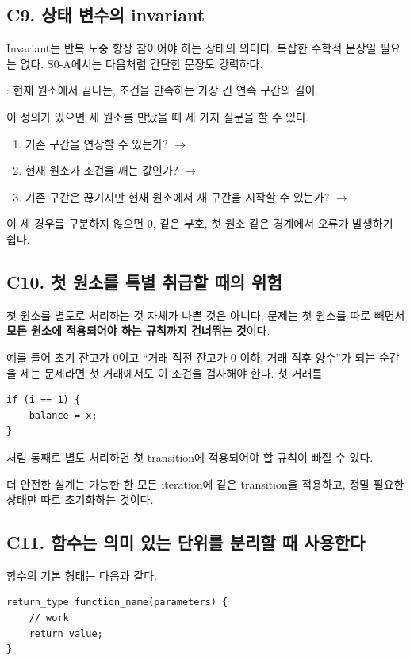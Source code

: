 \subsection{C9. 상태 변수의 invariant}
Invariant는 반복 도중 항상 참이어야 하는 상태의 의미다. 복잡한 수학적 문장일 필요는 없다. S0-A에서는 다음처럼 간단한 문장도 강력하다.

\begin{conceptbox}[예시 invariant]
: 현재 원소에서 끝나는, 조건을 만족하는 가장 긴 연속 구간의 길이.
\end{conceptbox}

이 정의가 있으면 새 원소를 만났을 때 세 가지 질문을 할 수 있다.
\begin{enumerate}
  \item 기존 구간을 연장할 수 있는가? $\rightarrow$ 
  \item 현재 원소가 조건을 깨는 값인가? $\rightarrow$ 
  \item 기존 구간은 끊기지만 현재 원소에서 새 구간을 시작할 수 있는가? $\rightarrow$ 
\end{enumerate}

이 세 경우를 구분하지 않으면 0, 같은 부호, 첫 원소 같은 경계에서 오류가 발생하기 쉽다.

\subsection{C10. 첫 원소를 특별 취급할 때의 위험}
첫 원소를 별도로 처리하는 것 자체가 나쁜 것은 아니다. 문제는 첫 원소를 따로 빼면서 \textbf{모든 원소에 적용되어야 하는 규칙까지 건너뛰는 것}이다.

예를 들어 초기 잔고가 0이고 ``거래 직전 잔고가 0 이하, 거래 직후 양수''가 되는 순간을 세는 문제라면 첫 거래에서도 이 조건을 검사해야 한다. 첫 거래를
\begin{lstlisting}
if (i == 1) {
    balance = x;
}
\end{lstlisting}
처럼 통째로 별도 처리하면 첫 transition에 적용되어야 할 규칙이 빠질 수 있다.

더 안전한 설계는 가능한 한 모든 iteration에 같은 transition을 적용하고, 정말 필요한 상태만 따로 초기화하는 것이다.

\subsection{C11. 함수는 의미 있는 단위를 분리할 때 사용한다}
함수의 기본 형태는 다음과 같다.
\begin{lstlisting}
return_type function_name(parameters) {
    // work
    return value;
}
\end{lstlisting}

